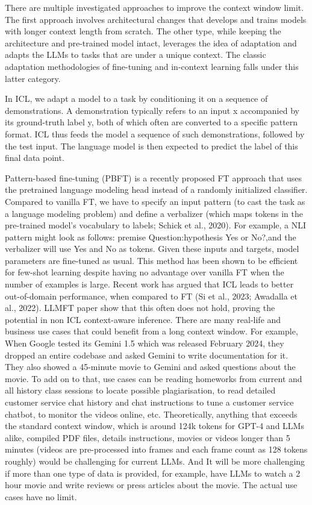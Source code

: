 \documentclass[10pt,twocolumn,letterpaper]{article}
\begin{document}
There are multiple investigated approaches to improve the context window limit. The first approach involves architectural changes that develops and trains models with longer context length from scratch. The other type, while keeping the architecture and pre-trained model intact, leverages the idea of adaptation and adapts the LLMs to tasks that are under a unique context. The classic adaptation methodologies of fine-tuning and in-context learning falls under this latter category. 

In ICL, we adapt a model to a task by conditioning it on a sequence of demonstrations. A demonstration typically refers to an input x accompanied by its ground-truth label y, both of which often are converted to a specific pattern format. ICL thus feeds the model a sequence of such demonstrations, followed by the test input. The language model is then expected to predict the label of this final data point.

Pattern-based fine-tuning (PBFT) is a recently proposed FT approach that uses the pretrained language modeling head instead of a randomly initialized classifier. Compared to vanilla FT, we have to specify an input pattern (to cast the task as a language modeling problem) and define a verbalizer (which maps tokens in the pre-trained model’s vocabulary to labels; Schick et al., 2020). For example, a NLI pattern might look as follows: {premise} Question:{hypothesis} Yes or No?,and the verbalizer will use Yes and No as tokens. Given these inputs and targets, model parameters are fine-tuned as usual. This method has been shown to be efficient for few-shot learning despite having no advantage over vanilla FT when the number of examples is large.
Recent work has argued that ICL leads to better out-of-domain performance, when compared to FT (Si et al., 2023; Awadalla et al., 2022). LLMFT paper show that this often does not hold, proving the potential in non ICL context-aware inference. 
There are many real-life and business use cases that could benefit from a long context window. For example, When Google tested its Gemini 1.5 which was released February 2024, they dropped an entire codebase and asked Gemini to write documentation for it. They also showed a 45-minute movie to Gemini and asked questions about the movie. To add on to that, use cases can be reading homeworks from current and all history class sessions to locate possible plagiarisation, to read detailed customer service chat history and chat instructions to tune a customer service chatbot, to monitor the videos online, etc. Theoretically, anything that exceeds the standard context window, which is around 124k tokens for GPT-4 and LLMs alike, compiled PDF files, details instructions, movies or videos longer than 5 minutes (videos are pre-processed into frames and each frame count as 128 tokens roughly) would be challenging for current LLMs. And It will be more challenging if more than one type of data is provided, for example, have LLMs to watch a 2 hour movie and write reviews or press articles about the movie. The actual use cases have no limit.
\end{document}
